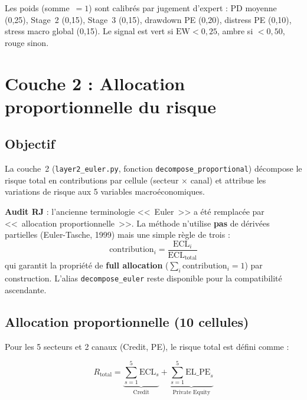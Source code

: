 \documentclass[12pt,a4paper]{article}
\begin{document}
Les poids (somme~$= 1$) sont calibr\'es par jugement d'expert :
PD moyenne (0,25), Stage~2 (0,15), Stage~3 (0,15), drawdown PE (0,20),
distress PE (0,10), stress macro global (0,15).
Le signal est vert si $\text{EW} < 0{,}25$, ambre si $< 0{,}50$, rouge sinon.


\newpage
\section{Couche 2 : Allocation proportionnelle du risque}

\subsection{Objectif}

La couche~2 (\texttt{layer2\_euler.py}, fonction \texttt{decompose\_proportional})
d\'ecompose le risque total en contributions par cellule (secteur $\times$ canal)
et attribue les variations de risque aux 5 variables macro\-\'economiques.

\begin{warningbox}
\textbf{Audit RJ} : l'ancienne terminologie <<~Euler~>> a \'et\'e remplac\'ee par
<<~allocation proportionnelle~>>. La m\'ethode n'utilise \textbf{pas} de d\'eriv\'ees
partielles (Euler-Tasche, 1999) mais une simple r\`egle de trois :
\[
    \text{contribution}_i = \frac{\text{ECL}_i}{\text{ECL}_{\text{total}}}
\]
qui garantit la propri\'et\'e de \textbf{full allocation}
($\sum_i \text{contribution}_i = 1$) par construction.
L'alias \texttt{decompose\_euler} reste disponible pour la compatibilit\'e ascendante.
\end{warningbox}

\subsection{Allocation proportionnelle (10 cellules)}

Pour les 5 secteurs et 2 canaux (Credit, PE), le risque total est d\'efini comme :

\begin{equation}
    R_{\text{total}} = \underbrace{\sum_{s=1}^{5} \text{ECL}_s}_{\text{Credit}}
    + \underbrace{\sum_{s=1}^{5} \text{EL\_PE}_s}_{\text{Private Equity}}
    \label{eq:total_risk}
\end{equation}
\end{document}
